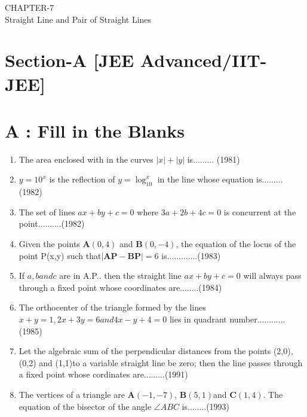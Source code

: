 \documentclass[12pt]{article}
\let\vec\mathbf
\begin{document}
\begin{center}
\textbf\large{CHAPTER-7 \\ Straight Line and Pair of Straight Lines}

\end{center}

\section*{Section-A    [JEE Advanced/IIT-JEE]}
\section*{A    :  Fill in the Blanks}
\begin{enumerate}

\item  The area enclosed with in the curves $|x|+|y|$ is.........  (1981) \\
\item  $y=10^x$ is the reflection of $y=\log_10^x $ in the line whose equation is.........(1982)\\
\item The set of lines $ax+by+c=0$ where $3a+2b+4c=0$ is concurrent at the point..........(1982)\\
\item  Given the points $\vec{A}(0,4)$ and $\vec{B}(0,-4)$, the equation of the locus of the point P(x,y) such that$|\vec{AP}-\vec{BP}|=6$ is.............(1983)\\
\item  If $a,b and c$ are in A.P.. then the straight line $ax+by+c=0$ will always pass through a fixed point whose coordinates are........(1984)\\
\item  The orthocenter of the triangle formed by the lines $x+y=1, 2x+3y=6  and  4x-y+4=0$ lies in quadrant number............(1985)\\
\item Let the algebraic sum of the perpendicular distances from the points (2,0), (0,2) and (1,1)to a variable straight line be zero; then the line passes through a fixed point whose cordinates are.........(1991)\\
\item The vertices of a triangle are $\vec{A}(-1,-7)$, $\vec{B}(5,1)$and $\vec{C}(1,4)$. The equation of the bisector of the angle $\angle{ABC}$ is........(1993)

\end{enumerate}
\end{document}
